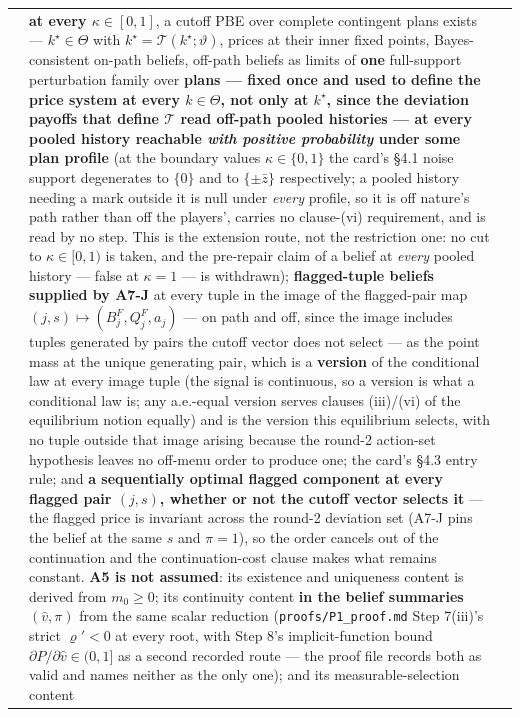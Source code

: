 \documentclass[11pt,a4paper]{article}
\newcommand{\Tmap}{\mathcal{T}}
\begin{document}
\begin{longtable}{@{}p{}>{\raggedright\arraybackslash}p{}>{\raggedright\arraybackslash}p{}@{}}
&
\textbf{at every $\kappa\in[0,1]$}, a cutoff PBE over complete contingent plans exists
--- $k^\star\in\Theta$ with $k^\star=\Tmap(k^\star;\vartheta)$, prices at their inner
fixed points, Bayes-consistent on-path beliefs, off-path beliefs as limits of
\textbf{one} full-support perturbation family over \textbf{plans --- fixed once and used
to define the price system at every $k\in\Theta$, not only at $k^\star$, since the
deviation payoffs that define $\Tmap$ read off-path pooled histories --- at every pooled
history reachable \emph{with positive probability} under some plan profile} (at the
boundary values $\kappa\in\{0,1\}$ the card's \S4.1 noise support degenerates to $\{0\}$
and to $\{\pm\bar z\}$ respectively; a pooled history needing a mark outside it is null
under \emph{every} profile, so it is off nature's path rather than off the players',
carries no clause-(vi) requirement, and is read by no step. This is the extension route,
not the restriction one: no cut to $\kappa\in[0,1)$ is taken, and the pre-repair claim of
a belief at \emph{every} pooled history --- false at $\kappa=1$ --- is withdrawn);
\textbf{flagged-tuple beliefs supplied by A7-J} at every tuple in the image of the
flagged-pair map $(j,s)\mapsto(B^F_j,Q^F_j,a_j)$ --- on path and off, since the image
includes tuples generated by pairs the cutoff vector does not select --- as the point
mass at the unique generating pair, which is a \textbf{version} of the conditional law at
every image tuple (the signal is continuous, so a version is what a conditional law is;
any a.e.-equal version serves clauses (iii)/(vi) of the equilibrium notion equally) and
is the version this equilibrium selects, with no tuple outside that image arising because
the round-2 action-set hypothesis leaves no off-menu order to produce one; the card's
\S4.3 entry rule; and \textbf{a sequentially optimal flagged component at every flagged
pair $(j,s)$, whether or not the cutoff vector selects it} --- the flagged price is
invariant across the round-2 deviation set (A7-J pins the belief at the same $s$ and
$\pi=1$), so the order cancels out of the continuation and the continuation-cost clause
makes what remains constant. \textbf{A5 is not assumed}: its existence and uniqueness
content is derived from $m_0\ge0$; its continuity content \textbf{in the belief summaries
$(\hat v,\pi)$} from the same scalar reduction (\texttt{proofs/P1\_proof.md} Step 7(iii)'s
strict $\varrho'<0$ at every root, with Step 8's implicit-function bound
$\partial P/\partial\hat v\in(0,1]$ as a second recorded route --- the proof file records
both as valid and names neither as the only one); and its measurable-selection content

\end{longtable}
\end{document}

